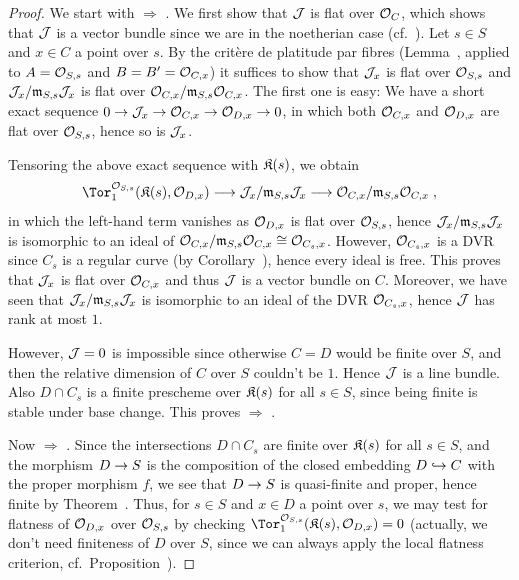 \documentclass[a4paper,parskip=half,numbers=enddot, DIV=12]{scrreprt}
\begin{document}
\begin{proof}
	We start with  $\Rightarrow$ . We first show that $\mathcal{J}$ is flat over $\mathcal{O}_C$, which shows that $\mathcal{J}$ is a vector bundle since we are in the noetherian case (cf.\ \cite[Proposition~1.3.2]{homalg}). Let $s\in S$ and $x\in C$ a point over $s$. By the critère de platitude par fibres (Lemma~, applied to $A=\mathcal{O}_{S,s}$ and $B=B'=\mathcal{O}_{C,x}$) it suffices to show that $\mathcal{J}_x$ is flat over $\mathcal{O}_{S,s}$ and $\mathcal{J}_x/\mathfrak{m}_{S,s}\mathcal{J}_x$ is flat over $\mathcal{O}_{C,x}/\mathfrak{m}_{S,s}\mathcal{O}_{C,x}$. The first one is easy: We have a short exact sequence $0\morphism \Jj_x\morphism\Oo_{C,x}\morphism\Oo_{D,x}\morphism 0$, in which both $\mathcal{O}_{C,x}$ and $\mathcal{O}_{D,x}$ are flat over $\mathcal{O}_{S,s}$, hence so is $\mathcal{J}_x$. 
	
	Tensoring  the above exact sequence with $\mathfrak{K}(s)$, we obtain
	\begin{align*}
		\Tor_1^{\Oo_{S,s}}(\KK(s),\Oo_{D,x})\morphism \Jj_x/\mm_{S,s}\Jj_x\morphism \Oo_{C,x}/\mm_{S,s}\Oo_{C,x}\;,
	\end{align*}
	in which the left-hand term vanishes as $\mathcal{O}_{D,x}$ is flat over $\mathcal{O}_{S,s}$, hence $\mathcal{J}_x/\mathfrak{m}_{S,s}\mathcal{J}_x$ is isomorphic to an ideal of $\mathcal{O}_{C,x}/\mathfrak{m}_{S,s}\mathcal{O}_{C,x}\cong \mathcal{O}_{C_s,x}$. However, $\mathcal{O}_{C_s,x}$ is a DVR since $C_s$ is a regular curve (by Corollary~), hence every ideal is free. This proves that $\mathcal{J}_x$ is flat over $\mathcal{O}_{C,x}$ and thus $\mathcal{J}$ is a vector bundle on $C$. Moreover, we have seen that $\mathcal{J}_x/\mathfrak{m}_{S,s}\mathcal{J}_x$ is isomorphic to an ideal of the DVR $\mathcal{O}_{C_s,x}$, hence $\mathcal{J}$ has rank at most $1$.
	
	However, $\mathcal{J}=0$ is impossible since otherwise $C=D$ would be finite over $S$, and then the relative dimension of $C$ over $S$ couldn't be $1$. Hence $\mathcal{J}$ is a line bundle. Also $D\cap C_s$ is a finite prescheme over $\mathfrak{K}(s)$ for all $s\in S$, since being finite is stable under base change. This proves  $\Rightarrow$ .
	
	Now  $\Rightarrow$ . Since the intersections $D\cap C_s$ are finite over $\mathfrak{K}(s)$ for all $s\in S$, and the morphism $D\morphism S$ is the composition of the closed embedding $D\monomorphism C$ with the proper morphism $f$, we see that $D\morphism S$ is quasi-finite and proper, hence finite by Theorem~. Thus, for $s\in S$ and $x\in D$ a point over $s$, we may test for flatness of $\mathcal{O}_{D,x}$ over $\mathcal{O}_{S,s}$ by checking $\Tor_1^{\Oo_{S,s}}(\KK(s),\Oo_{D,x})=0$ (actually, we don't need finiteness of $D$ over $S$, since we can always apply the local flatness criterion, cf.\ Proposition~).
	

\end{proof}
\end{document}
